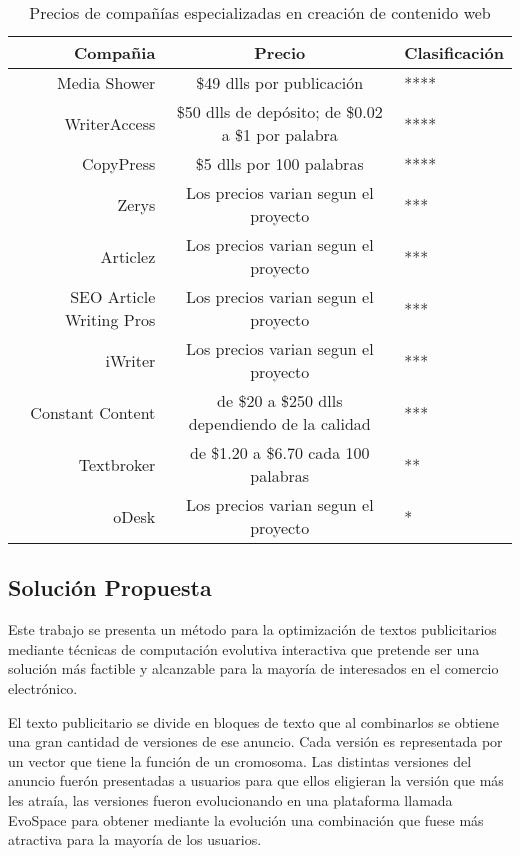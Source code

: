\begin{table}
\caption{Precios de compañías especializadas en creación de contenido web}
\label{precios}
\begin{center}
\begin{tabular}{|r|c|l|}
Compañia & Precio & Clasificación \\\hline \hline

Media Shower	 & \$49 dlls por publicación & ****\\
WriterAccess & \$50 dlls de depósito; de \$0.02 a \$1 por palabra & ****\\
CopyPress	 & \$5 dlls por 100 palabras & ****\\
Zerys	 & Los precios varian segun el proyecto & ***\\
Articlez & Los precios varian segun el proyecto & ***\\
SEO Article Writing Pros & Los precios varian segun el proyecto & ***\\
iWriter	 & Los precios varian segun el proyecto & ***\\
Constant Content	 & de \$20 a \$250 dlls dependiendo de la calidad & ***\\
Textbroker & de \$1.20 a \$6.70 cada 100 palabras & **\\
oDesk	 & Los precios varian segun el proyecto & *\\

\end{tabular}
\end{center}
\end{table}

\clearpage
\subsection{Solución Propuesta}

Este trabajo se presenta un método para la optimización de textos publicitarios mediante técnicas de computación evolutiva interactiva que pretende ser una solución más factible y alcanzable para la mayoría de interesados en el comercio electrónico.

El texto publicitario se divide en bloques de texto que al combinarlos se obtiene una gran cantidad de versiones de ese anuncio. Cada versión es representada por un vector que tiene la función de un cromosoma. Las distintas versiones del anuncio fuerón presentadas a usuarios para que ellos eligieran la versión que más les atraía, las versiones fueron evolucionando en una plataforma llamada EvoSpace para obtener mediante la evolución una combinación que fuese más atractiva para la mayoría de los usuarios. 

